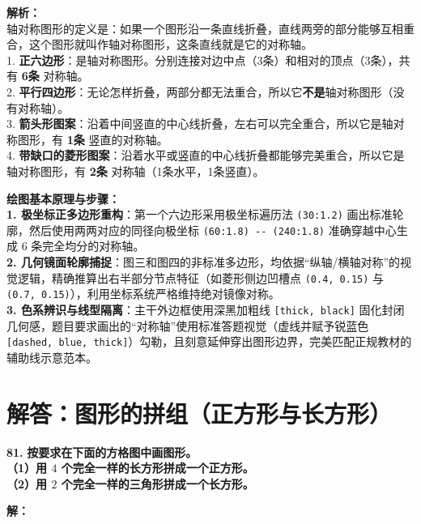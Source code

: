 \vspace{0.8cm}

{\small\color{gray}
\textbf{解析：}\\
轴对称图形的定义是：如果一个图形沿一条直线折叠，直线两旁的部分能够互相重合，这个图形就叫作轴对称图形，这条直线就是它的对称轴。\\
1. \textbf{正六边形}：是轴对称图形。分别连接对边中点（3条）和相对的顶点（3条），共有 \textbf{6条} 对称轴。\\
2. \textbf{平行四边形}：无论怎样折叠，两部分都无法重合，所以它\textbf{不是}轴对称图形（没有对称轴）。\\
3. \textbf{箭头形图案}：沿着中间竖直的中心线折叠，左右可以完全重合，所以它是轴对称图形，有 \textbf{1条} 竖直的对称轴。\\
4. \textbf{带缺口的菱形图案}：沿着水平或竖直的中心线折叠都能够完美重合，所以它是轴对称图形，有 \textbf{2条} 对称轴（1条水平，1条竖直）。
}

\vspace{0.6cm}

{\small\color{blue!70!black}
\textbf{绘图基本原理与步骤：}\\
\textbf{1. 极坐标正多边形重构}：第一个六边形采用极坐标遍历法 \texttt{(30:1.2)} 画出标准轮廓，然后使用两两对应的同径向极坐标 \texttt{(60:1.8) -{}- (240:1.8)} 准确穿越中心生成 6 条完全均分的对称轴。\\
\textbf{2. 几何镜面轮廓捕捉}：图三和图四的非标准多边形，均依据“纵轴/横轴对称”的视觉逻辑，精确推算出右半部分节点特征（如菱形侧边凹槽点 \texttt{(0.4, 0.15)} 与 \texttt{(0.7, 0.15)}），利用坐标系统严格维持绝对镜像对称。\\
\textbf{3. 色系辨识与线型隔离}：主干外边框使用深黑加粗线 \texttt{[thick, black]} 固化封闭几何感，题目要求画出的“对称轴”使用标准答题视觉（虚线并赋予锐蓝色 \texttt{[dashed, blue, thick]}）勾勒，且刻意延伸穿出图形边界，完美匹配正规教材的辅助线示意范本。
}


\section{解答：图形的拼组（正方形与长方形）}

\vspace{0.6cm}

\textbf{\LARGE 81.} \textbf{按要求在下面的方格图中画图形。\\[1ex]
（1）用 $4$ 个完全一样的长方形拼成一个正方形。\\[1ex]
（2）用 $2$ 个完全一样的三角形拼成一个长方形。}

\vspace{0.4cm}
\textbf{解：}

